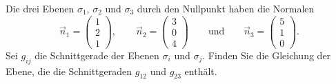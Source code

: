 Die drei Ebenen $\sigma_1$, $\sigma_2$ und $\sigma_3$ durch den Nullpunkt
haben die Normalen
\[
\vec n_1=
\begin{pmatrix}1\\2\\1\end{pmatrix},
\qquad
\vec n_2=
\begin{pmatrix}3\\0\\4\end{pmatrix}
\qquad\text{und}\qquad
\vec n_3=
\begin{pmatrix}5\\1\\0\end{pmatrix}.
\]
Sei $g_{ij}$ die Schnittgerade der Ebenen $\sigma_i$ und $\sigma_j$.
Finden Sie die Gleichung der Ebene, die die Schnittgeraden $g_{12}$
und $g_{23}$ enthält.


